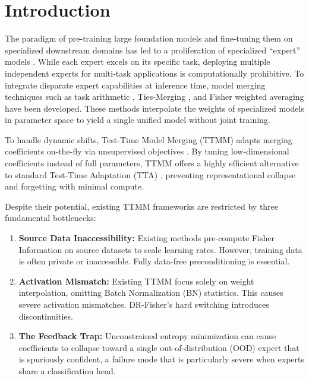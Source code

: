 \documentclass{article}
\theoremstyle{plain}
\theoremstyle{definition}
\theoremstyle{remark}
\begin{document}
\section{Introduction}\vspace{-0.1in}
\label{sec:introduction}

The paradigm of pre-training large foundation models and fine-tuning them on specialized downstream
domains has led to a proliferation of specialized ``expert'' models \cite{Wortsman2022,
Radford2021}. While each expert excels on its specific task, deploying multiple independent experts
for multi-task applications is computationally prohibitive. To integrate disparate expert
capabilities at inference time, model merging techniques such as task arithmetic \cite{Ilharco2023},
Ties-Merging \cite{Yadav2023}, and Fisher weighted averaging \cite{Matena2022} have been developed.
These methods interpolate the weights of specialized models in parameter space to yield a single
unified model without joint training.

To handle dynamic shifts, Test-Time Model Merging (TTMM) adapts merging coefficients on-the-fly via
unsupervised objectives \cite{Yang2023, Yang2024}. By tuning low-dimensional coefficients instead of
full parameters, TTMM offers a highly efficient alternative to standard Test-Time Adaptation (TTA)
\cite{Wang2021}, preventing representational collapse and forgetting with minimal compute.

Despite their potential, existing TTMM frameworks are restricted by three fundamental bottlenecks:
\begin{enumerate}
\item \textbf{Source Data Inaccessibility:} Existing methods pre-compute Fisher Information on
source datasets to scale learning rates. However, training data is often private or inaccessible.
Fully data-free preconditioning is essential.
\item \textbf{Activation Mismatch:} Existing TTMM focus solely on weight interpolation, omitting
Batch Normalization (BN) statistics. This causes severe activation mismatches. DR-Fisher's hard
switching introduces discontinuities.
\item \textbf{The Feedback Trap:} Unconstrained entropy minimization can cause coefficients to
collapse toward a single out-of-distribution (OOD) expert that is spuriously confident, a failure
mode that is particularly severe when experts share a classification head.
\end{enumerate}
\end{document}
